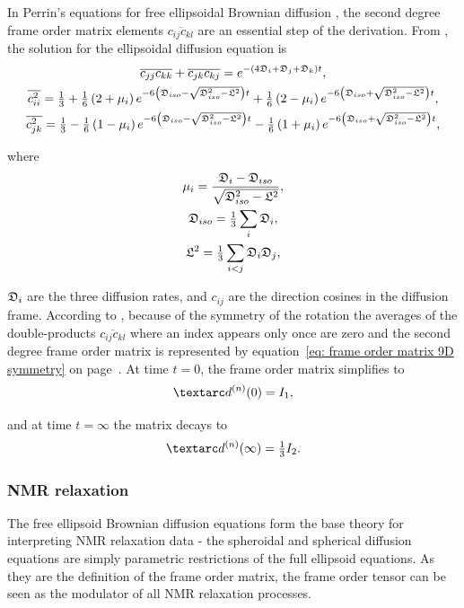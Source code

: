 In Perrin's equations for free ellipsoidal Brownian diffusion \citep{Perrin34,Perrin36}, the second degree frame order matrix elements $\overline{c_{ij}c_{kl}}$ are an essential step of the derivation.
From \citet{Perrin36}, the solution for the ellipsoidal diffusion equation is
\begin{gather}
    \overline{c_{jj}c_{kk}} + \overline{c_{jk}c_{kj}} = e^{-(4 \mathfrak{D}_i + \mathfrak{D}_j + \mathfrak{D}_k)t} , \label{eq: cjjckk + cjkckj} \\
    \overline{c_{ii}^2} = \tfrac{1}{3}   + \tfrac{1}{6} \left(2 + \mu_i \right) e^{ -6 \left(\mathfrak{D}_{iso} - \sqrt{\mathfrak{D}_{iso}^2 - \mathfrak{L}^2}\right)t} + \tfrac{1}{6} \left(2 - \mu_i \right) e^{ -6 \left(\mathfrak{D}_{iso} + \sqrt{\mathfrak{D}_{iso}^2 - \mathfrak{L}^2}\right)t} , \label{eq: cii2} \\
    \overline{c_{jk}^2} = \tfrac{1}{3}   - \tfrac{1}{6} \left(1 - \mu_i \right) e^{ -6 \left(\mathfrak{D}_{iso} - \sqrt{\mathfrak{D}_{iso}^2 - \mathfrak{L}^2}\right)t} - \tfrac{1}{6} \left(1 + \mu_i \right) e^{ -6 \left(\mathfrak{D}_{iso} + \sqrt{\mathfrak{D}_{iso}^2 - \mathfrak{L}^2}\right)t} , \label{eq: cjk2}
\end{gather}

where
\begin{gather}
    \mu_i = \frac{\mathfrak{D}_i - \mathfrak{D}_{iso}}{\sqrt{\mathfrak{D}_{iso}^2 - \mathfrak{L}^2}} , \\
    \mathfrak{D}_{iso} = \tfrac{1}{3} \sum_i \mathfrak{D}_i , \\
    \mathfrak{L}^2 = \tfrac{1}{3} \sum_{i<j} \mathfrak{D}_i \mathfrak{D}_j ,
\end{gather}

$\mathfrak{D}_i$ are the three diffusion rates, and $c_{ij}$ are the direction cosines in the diffusion frame.
According to \citet{Perrin36}, because of the symmetry of the rotation the averages of the double-products $\overline{c_{ij}c_{kl}}$ where an index appears only once are zero and the second degree frame order matrix is represented by equation~\ref{eq: frame order matrix 9D symmetry} on page~\pageref{eq: frame order matrix 9D symmetry}.
At time $t = 0$, the frame order matrix simplifies to
\begin{equation}
    \FOn(0) = I_1 ,
\end{equation}

and at time $t = \infty$ the matrix decays to
\begin{equation}
    \FOn(\infty) = \tfrac{1}{3} I_2 .
\end{equation}




\subsubsection{NMR relaxation}

The free ellipsoid Brownian diffusion equations form the base theory for interpreting NMR relaxation data - the spheroidal and spherical diffusion equations are simply parametric restrictions of the full ellipsoid equations.
As they are the definition of the frame order matrix, the frame order tensor can be seen as the modulator of all NMR relaxation processes.
